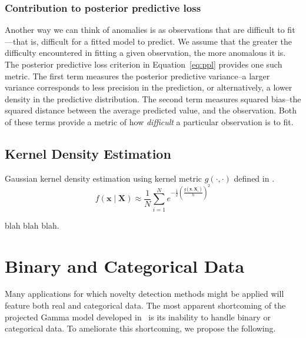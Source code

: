 \subsubsection{Contribution to posterior predictive loss}
Another way we can think of anomalies is as observations that are difficult to 
  fit---that is, difficult for a fitted model to predict.  We assume that the 
  greater the difficulty encountered in fitting a given observation, the more 
  anomalous it is.  The posterior predictive loss criterion in
  Equation~\ref{eq:ppl} provides one such metric.  The first term measures the 
  posterior predictive variance--a larger variance corresponds to less precision 
  in the prediction, or alternatively, a lower density in the predictive 
  distribution.  The second term measures squared bias--the squared distance 
  between the average predicted value, and the observation.  Both of these terms 
  provide a metric of how \emph{difficult} a particular observation is to fit.

\subsection{Kernel Density Estimation}

Gaussian kernel density estimation using kernel metric $g(\cdot,\cdot)$ defined 
  in \cite{trubey:pg}.
  \begin{equation}
    f(\bm{x}\mid \bm{X}) \approx 
      \frac{1}{N}\sum_{i = 1}^N
      e^{-\frac{1}{2}\left(\frac{g(\bm{x},\bm{X}_i^{\prime})}{h}\right)^2}
  \end{equation}

blah blah blah.


\section{Binary and Categorical Data}

Many applications for which novelty detection methods might be applied will 
  feature both real and categorical data.   The most apparent 
  shortcoming of the projected Gamma model developed in~\cite{trubey:pg} is
  its inability to handle binary or categorical data.  To ameliorate this 
  shortcoming, we propose the following.

